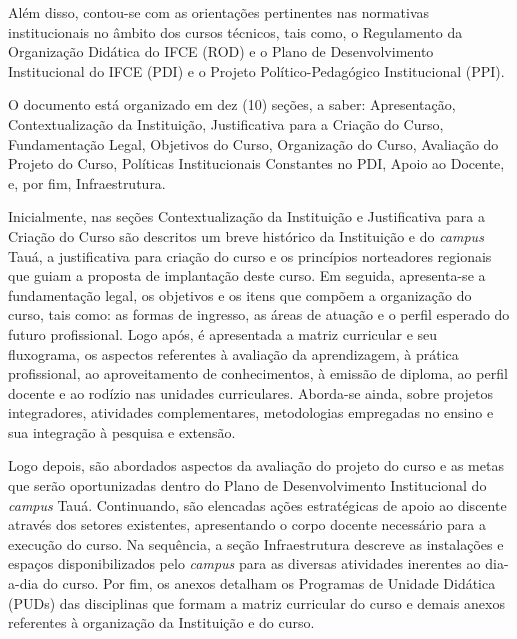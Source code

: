  

 


 
 Além disso, contou-se com as orientações pertinentes nas normativas
 institucionais no âmbito dos cursos técnicos, tais como, o Regulamento da
 Organização Didática do IFCE (ROD) e  o Plano de Desenvolvimento Institucional
 do IFCE (PDI) e o Projeto Político-Pedagógico Institucional (PPI).
 

O documento está organizado em dez (10) seções, a saber: Apresentação, Contextualização da Instituição, Justificativa para a Criação do Curso, Fundamentação Legal, Objetivos do Curso, Organização do Curso, Avaliação do Projeto do Curso, Políticas Institucionais Constantes no PDI, Apoio ao Docente, e, por fim, Infraestrutura.


Inicialmente, nas seções Contextualização da Instituição e Justificativa para a Criação do Curso são descritos um breve histórico da Instituição e do \textit{campus} Tauá, a justificativa para criação do curso e os princípios norteadores regionais que guiam a proposta de implantação deste curso. Em seguida, apresenta-se a fundamentação legal, os objetivos e os itens que compõem a organização do curso, tais como: as formas de ingresso, as áreas de atuação e o perfil esperado do futuro profissional. Logo após, é apresentada a  matriz curricular e seu fluxograma, os aspectos referentes à avaliação da aprendizagem, à prática profissional, ao aproveitamento de conhecimentos, à emissão de diploma, ao perfil docente e ao rodízio nas unidades curriculares. Aborda-se ainda, sobre projetos integradores, atividades complementares, metodologias empregadas no ensino e sua integração \`a pesquisa e extensão.

Logo depois, são abordados aspectos  da avaliação do projeto do curso e as metas que serão oportunizadas dentro do Plano de Desenvolvimento Institucional do \textit{campus} Tauá. Continuando, são elencadas ações estratégicas de apoio ao discente através dos setores existentes, apresentando o corpo docente necessário para a execução do curso. Na sequência, a seção Infraestrutura descreve as instalações e espaços disponibilizados pelo \textit{campus} para as diversas atividades inerentes ao dia-a-dia do curso. Por fim, os anexos detalham os Programas de Unidade Didática (PUDs) das disciplinas que formam a matriz curricular do curso e demais anexos referentes à organização da Instituição e do curso.


